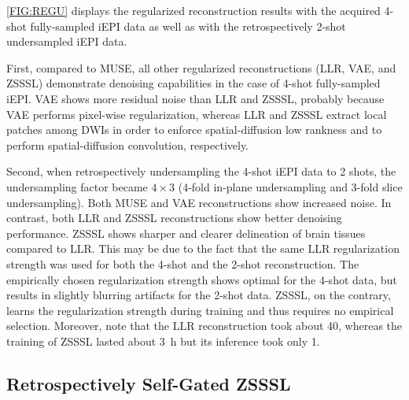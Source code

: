\documentclass[journal,twoside,web]{ieeecolor}
\begin{document}
	\cref{FIG:REGU} displays the regularized reconstruction results
	with the acquired 4-shot fully-sampled iEPI data as well as
	with the retrospectively 2-shot undersampled iEPI data.

	First, compared to MUSE, all other regularized reconstructions (LLR, VAE, and ZSSSL)
	demonstrate denoising capabilities in the case of 4-shot fully-sampled iEPI.
	VAE shows more residual noise than LLR and ZSSSL,
	probably because VAE performs pixel-wise regularization,
	whereas LLR and ZSSSL extract local patches among DWIs
	in order to enforce spatial-diffusion low rankness
	and to perform spatial-diffusion convolution, respectively.

	Second, when retrospectively undersampling the 4-shot iEPI data to 2 shots,
	the undersampling factor became $4 \times 3$
	(4-fold in-plane undersampling and 3-fold slice undersampling).
	Both MUSE and VAE reconstructions show increased noise.
	In contrast, both LLR and ZSSSL reconstructions show better denoising performance.
	ZSSSL shows sharper and clearer delineation of brain tissues compared to LLR.
	This may be due to the fact that the same LLR regularization strength was used
	for both the 4-shot and the 2-shot reconstruction.
	The empirically chosen regularization strength shows optimal for the 4-shot data,
	but results in slightly blurring artifacts for the 2-shot data.
	ZSSSL, on the contrary, learns the regularization strength during training
	and thus requires no empirical selection.
	Moreover, note that the LLR reconstruction took about \SI{40}{\min},
	whereas the training of ZSSSL lasted about \SI{3}{\hour}
	but its inference took only \SI{1}{\min}.


	\subsection{Retrospectively Self-Gated ZSSSL}
\end{document}
